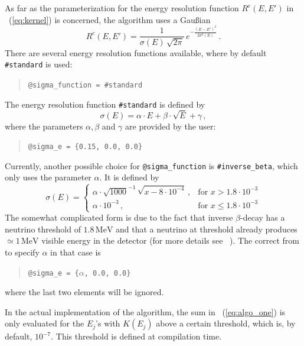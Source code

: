 %
As far as the parameterization for the energy resolution function 
$R^c(E,E')$ in \eq~(\ref{eq:kernel}) is concerned, the algorithm uses
a Gau\ss ian
\begin{equation}
R^c(E,E')=\frac{1}{\sigma(E)\,\sqrt{2\pi}}\,e^{-\frac{(E-E')^2}{2\sigma^2(E)}} \, .
\end{equation} 
%
%
There are several energy resolution functions available, where by default
{\tt \#standard} is used:
\begin{quote}
{\tt \tb @sigma\_function = \#standard} 
\end{quote}
%
%
The energy resolution function {\tt \#standard} is defined by
\begin{equation}
\label{eq:sigma_e}
\sigma(E)=\alpha\cdot E + \beta \cdot \sqrt{E} +\gamma\, ,
\end{equation}
where the parameters $\alpha, \beta$ and $\gamma$ are provided by the user:
\begin{quote}
{\tt \tb @sigma\_e = \{0.15, 0.0, 0.0\}}
\end{quote}
Currently, another possible choice for {\tt @sigma\_function} is {\tt \#inverse\_beta},
%
%
which only uses the parameter $\alpha$. It is defined by
\begin{equation}
\sigma(E)= \left\{\begin{array}{cl}
 \alpha \cdot \sqrt{1000}^{-1}\,\sqrt{x-8\cdot10^{-4}}\,,&\mathrm{for}\,\, 
x>1.8\cdot10^{-3}\\
\alpha\cdot10^{-3} \,,&\mathrm{for}\,\, x \leq 1.8\cdot10^{-3}
\end{array} \right.
\end{equation}
The somewhat complicated form is due to the fact that inverse $\beta$-decay
has a neutrino threshold of $1.8\,\mathrm{MeV}$ and that a neutrino
at threshold already produces $\simeq 1\,\mathrm{MeV}$ visible energy in
the detector (for more details see \eg~\cite{Huber:2003pm}). The
correct from to specify $\alpha$ in that case is

\begin{quote}
{\tt \tb @sigma\_e = \{$\alpha$, 0.0, 0.0\}}
\end{quote}

where the last two elements will be ignored.

In the actual implementation of the algorithm,  the sum in \eq~(\ref{eq:algo_one}) is only evaluated
 for the $E_j$'s with $K(E_j)$ 
above a certain threshold, which is, by default, $10^{-7}$. 
This threshold is defined at compilation time. 

